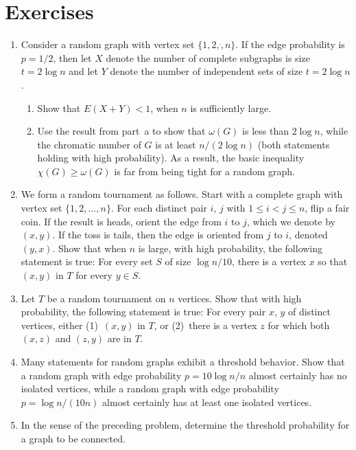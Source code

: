 \section{Exercises}\label{s:ramsey:exercises}

\begin{enumerate}
\item  Consider a random graph with vertex set $\{1,2,\dot,n\}$.
If the edge probability is $p=1/2$, then let $X$ denote the number
of complete subgraphs is size $t=2\log n$ and let $Y$ denote the
number of independent sets of size $t=2\log n$.
\begin{enumerate}
\item  Show that $E(X+Y)<1$, when $n$ is sufficiently large.
\item  Use the result from part~a to show that $\omega(G)$ is less
than $2\log n$, while the chromatic number of $G$ is at least $n/(2\log n)$
(both statements holding with high probability).  As a result, the basic
inequality $\chi(G)\ge\omega(G)$ is far from being tight for a random
graph.
\end{enumerate}
\item  We form a random tournament as follows.  Start with a complete graph 
with vertex set $\{1,2,\dots,n\}$.  For each distinct
pair $i$, $j$ with $1\le i<j\le n$, flip a fair coin.  If the result is heads,
orient the edge from $i$ to $j$, which we denote by $(x,y)$.  If the toss is
tails, then the edge is oriented from $j$ to $i$, denoted $(y,x)$.
Show that when $n$ is large, with high probability, the following 
statement is true: For every set $S$ of size $\log n/10$, there is a vertex 
$x$ so that $(x,y)$ in $T$ for every $y\in S$.
\item  Let $T$ be a random tournament on $n$ vertices.  Show that with
high probability, the following statement is true: For every pair $x$, $y$
of distinct vertices, either (1)~$(x,y)$ in $T$, or (2)~there is a vertex
$z$ for which both $(x,z)$ and $(z,y)$ are in $T$.
\item Many statements for random graphs exhibit a threshold behavior.
Show that a random graph with edge probability $p=10\log n/n$ almost
certainly has no isolated vertices, while a random graph with edge probability 
$p=\log n/(10 n)$ almost certainly has at least one isolated vertices.
\item In the sense of the preceding problem, determine the threshold probability
for a graph to be connected.
\end{enumerate}

